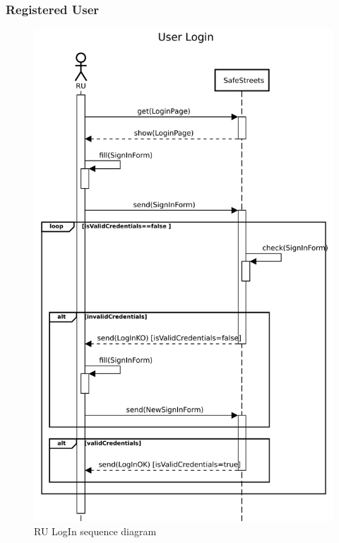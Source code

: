 				\subsubsection{Registered User}
					\begin{figure}[!h]
								\centering
							\includegraphics[height=0.8\textheight] {images/SequenceDiagram/User/UserLogIn.pdf}
								\caption{RU LogIn sequence diagram}
						\end{figure}
